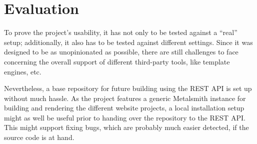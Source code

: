 \chapter{Evaluation}
\label{cha:evaluation}

To prove the project's usability, it has not only to be tested against a ``real'' setup; additionally, it also has to be tested against different settings. Since it was designed to be as unopinionated as possible, there are still challenges to face concerning the overall support of different third-party tools, like template engines, etc.

Nevertheless, a base repository for future building using the REST API is set up without much hassle. As the project features a generic Metalsmith instance for building and rendering the different website projects, a local installation setup might as well be useful prior to handing over the repository to the REST API. This might support fixing bugs, which are probably much easier detected, if the source code is at hand.






